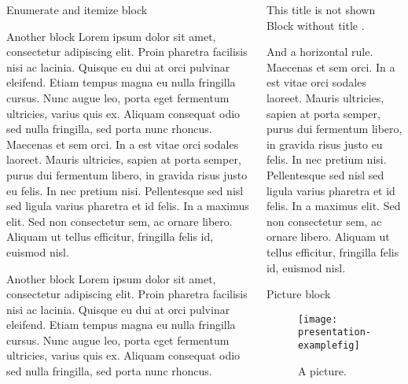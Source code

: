 \documentclass[english,xcolor=table,t]{beamer}
\begin{document}
\begin{frame}
\begin{columns}
\begin{vfillcolumn}{\colwidth}
\begin{block}{Enumerate and itemize block}
\end{block}

\vfill
\begin{block}{Another block}
Lorem ipsum dolor sit amet, consectetur adipiscing elit. Proin pharetra facilisis nisi ac lacinia. Quisque eu dui at orci pulvinar eleifend. Etiam tempus magna eu nulla fringilla cursus. Nunc augue leo, porta eget fermentum ultricies, varius quis ex. Aliquam consequat odio sed nulla fringilla, sed porta nunc rhoncus. Maecenas et sem orci. In a est vitae orci sodales laoreet. Mauris ultricies, sapien at porta semper, purus dui fermentum libero, in gravida risus justo eu felis. In nec pretium nisi. Pellentesque sed nisl sed ligula varius pharetra et id felis. In a maximus elit. Sed non consectetur sem, ac ornare libero. Aliquam ut tellus efficitur, fringilla felis id, euismod nisl.
\end{block}

\vfill
\begin{block}{Another block}
Lorem ipsum dolor sit amet, consectetur adipiscing elit. Proin pharetra facilisis nisi ac lacinia. Quisque eu dui at orci pulvinar eleifend. Etiam tempus magna eu nulla fringilla cursus. Nunc augue leo, porta eget fermentum ultricies, varius quis ex. Aliquam consequat odio sed nulla fringilla, sed porta nunc rhoncus. 
\end{block}

\end{vfillcolumn}

\begin{vfillcolumn}{\colwidth}

\begin{exampleblock}{This title is not shown}
Block without title \citep{einstein1905elektrodynamik}.

And a horizontal rule.
\blockhrule
Maecenas et sem orci. In a est vitae orci sodales laoreet. Mauris ultricies, sapien at porta semper, purus dui fermentum libero, in gravida risus justo eu felis. In nec pretium nisi. Pellentesque sed nisl sed ligula varius pharetra et id felis. In a maximus elit. Sed non consectetur sem, ac ornare libero. Aliquam ut tellus efficitur, fringilla felis id, euismod nisl.
\end{exampleblock} 

\vfill 
\begin{block}{Picture block}
\begin{figure}
	\centering
    \texttt{[image: presentation-examplefig]}
	\caption{A picture.}
\end{figure}


\end{block}
\end{vfillcolumn}
\end{columns}
\end{frame}
\end{document}
